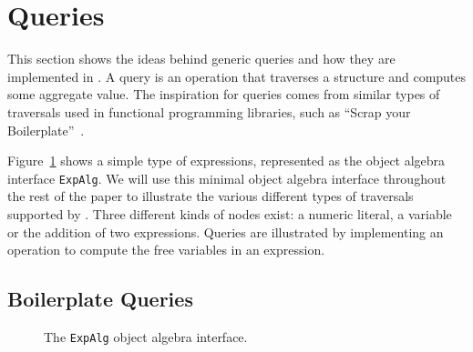 \section{Queries}\label{sec:queries}

This section shows the ideas behind generic queries and how they are
implemented in \Name.  A query is an operation that traverses a
structure and computes some aggregate value. The inspiration for
queries comes from similar types of traversals used in functional
programming libraries, such as ``Scrap your
Boilerplate''~\cite{ralf03syb}. 


Figure~\ref{exp_alg} shows a simple type of expressions, represented
as the object algebra interface \lstinline{ExpAlg}. We will use this
minimal object algebra interface throughout the rest of the paper to
illustrate the various different types of traversals supported by
\Name.  Three different kinds of nodes exist: a numeric literal, a
variable or the addition of two expressions. Queries are illustrated 
by implementing an operation to compute the free variables in an expression.

\begin{comment}
As a specific type of object algebras, queries allow users to define
new operations handling a user-defined data structure\bruno{This
  definition of queries is just too broad. Please
look at papers like Syb to see how they describe queries and transformations}. A \textit{query
  algebra} is a class implementing an object algebra interface by a
top-down traversal throughout the hierarchy. It is something
supporting the program to gather information from the substructures of
a data type recursively, and make a response at the root node to the
query.
\end{comment}

\subsection{Boilerplate Queries}\label{subsec:freevars}

\begin{figure}[!htbp]
\vspace{-.1in}
\caption{The \lstinline{ExpAlg} object algebra interface.}
\label{exp_alg}
\end{figure}

